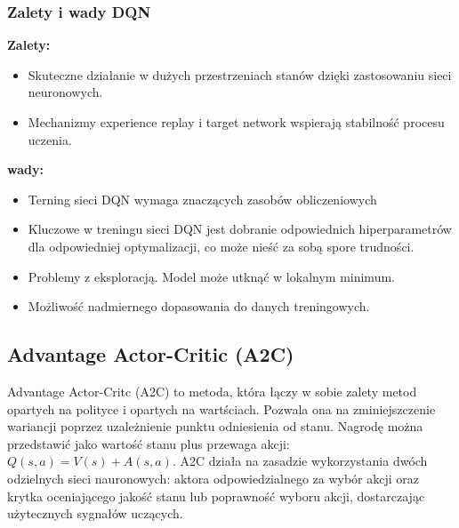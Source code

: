 \documentclass[a4paper, 12pt]{article}
\numberwithin{equation}{section}
\begin{document}
    \subsubsection{Zalety i wady DQN}
    \noindent \textbf{Zalety:}
    \begin{itemize}
        \item Skuteczne działanie w dużych przestrzeniach stanów dzięki zastosowaniu sieci neuronowych.
        \item Mechanizmy experience replay i target network wspierają stabilność procesu uczenia.
    \end{itemize}
    \textbf{wady:}
    \begin{itemize}
        \item Terning sieci DQN wymaga znaczących zasobów obliczeniowych
        \item Kluczowe w treningu sieci DQN jest dobranie odpowiednich hiperparametrów dla odpowiedniej optymalizacji,
        co może nieść za sobą spore trudności.
        \item Problemy z eksploracją. Model może utknąć w lokalnym minimum.
        \item Możliwość nadmiernego dopasowania do danych treningowych.
    \end{itemize}
    \subsection{Advantage Actor-Critic (A2C)}
    Advantage Actor-Critc (A2C) to metoda, która łączy w sobie zalety metod opartych na polityce i opartych na wartściach.
    Pozwala ona na zminiejszczenie wariancji poprzez uzależnienie punktu odniesienia od stanu. Nagrodę można przedstawić
    jako wartość stanu plus przewaga akcji: \( Q(s,a) = V(s) + A(s,a) \). A2C działa na zasadzie wykorzystania dwóch odzielnych
    sieci nauronowych: aktora odpowiedzialnego za wybór akcji oraz krytka oceniającego jakość stanu lub poprawność wyboru akcji, dostarczając użytecznych sygnałów uczących.
\end{document}
